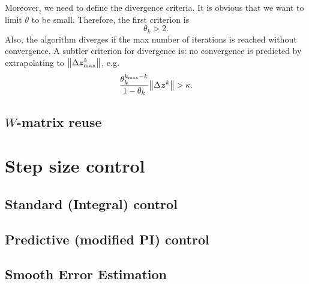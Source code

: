 \documentclass[a4paper,9pt]{article}
\theoremstyle{definition}
\theoremstyle{remark}
\begin{document}
Moreover, we need to define the divergence criteria. It is obvious that we want
to limit $\theta$ to be small. Therefore, the first criterion is
\begin{equation}
  \theta_k > 2.
\end{equation}
Also, the algorithm diverges if the max number of iterations is reached without
convergence. A subtler criterion for divergence is: no convergence is predicted
by extrapolating to $\norm{\Delta\bm{z}^k_{\max}}$, e.g.
\begin{equation}
  \frac{\theta_k^{k_{\max}-k}}{1-\theta_k} \norm{\Delta\bm{z}^k} > \kappa.
\end{equation}

\subsection{$W$-matrix reuse}

\section{Step size control}
\subsection{Standard (Integral) control}
\subsection{Predictive (modified PI) control}
\subsection{Smooth Error Estimation}

\nocite{hairer2010solving}



\end{document}
